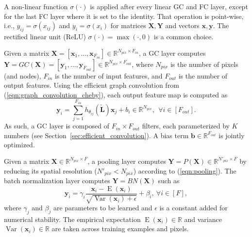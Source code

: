 \documentclass[final,twocolumn,3p,times,sort&compress]{elsarticle}
\newcommand{\secref}[1]{Section~\ref{sec:#1}}
\newcommand{\eqnref}[1]{(\ref{eqn:#1})}
\renewcommand{\b}[1]{{\bm{#1}}}   %
\newcommand{\1}{\b{1}}              %
\newcommand{\0}{\b{0}}              %
\renewcommand{\L}{\b{L}}
\newcommand{\tL}{\tilde{\L}}
\newcommand{\x}{\b{x}}
\newcommand{\X}{\b{X}}
\newcommand{\y}{\b{y}}
\newcommand{\Y}{\b{Y}}
\newcommand{\R}{\mathbb{R}}
\DeclareMathOperator*{\esp}{E}
\DeclareMathOperator*{\var}{Var}
\begin{document}
A non-linear function $\sigma(\cdot)$ is applied after every linear GC and FC layer, except for the last FC layer where it is set to the identity. That operation is point-wise, i.e., $y_{ij} = \sigma(x_{ij})$ and $y_i = \sigma(x_i)$ for matrices $\X, \Y$ and vectors $\x, \y$. The rectified linear unit (ReLU) $\sigma(\cdot) = \max(\cdot, 0)$ is a common choice.

Given a matrix $\X = [\x_1, \ldots, \x_{F_{in}}] \in \R^{N_{pix} \times F_{in}}$, a GC layer computes $\Y = GC(\X) = [\y_1, \ldots, \y_{F_{out}}] \in \R^{N_{pix} \times F_{out}}$, where $N_{pix}$ is the number of pixels (and nodes), $F_{in}$ is the number of input features, and $F_{out}$ is the number of output features.
Using the efficient graph convolution from \eqnref{graph_convolution_cheby}, each output feature map is computed as
\begin{equation*}
	\y_i = \sum_{j=1}^{F_{in}} h_{\theta_{ij}}(\tL) \x_j + b_i \in \R^{N_{pix}}, \ \ \forall i \in [F_{out}].
\end{equation*}
As such, a GC layer is composed of $F_{in} \times F_{out}$ filters, each parameterized by $K$ numbers (see \secref{efficient_convolution}). A bias term $\b b \in \R^{F_{out}}$ is jointly optimized.

Given a matrix $\X \in \R^{N_{pix} \times F}$, a pooling layer computes $\Y = P(\X) \in \R^{N'_{pix} \times F}$ by reducing its spatial resolution ($N'_{pix} < N_{pix}$) according to \eqnref{pooling}.
The batch normalization layer \citep{ioffe2015batchnorm} computes $\Y = BN(\X)$ such as
\begin{equation*}
	\y_i = \gamma_i \frac{\x_i - \esp(\x_i)}{\sqrt{\var(\x_i) + \epsilon}} + \beta_i, \ \forall i \in [F],
\end{equation*}
where $\gamma_{j}$ and $\beta_{j}$ are parameters to be learned and $\epsilon$ is a constant added for numerical stability. The empirical expectation $\esp(\x_i) \in \R$ and variance $\var(\x_i) \in \R$ are taken across training examples and pixels.

\end{document}
